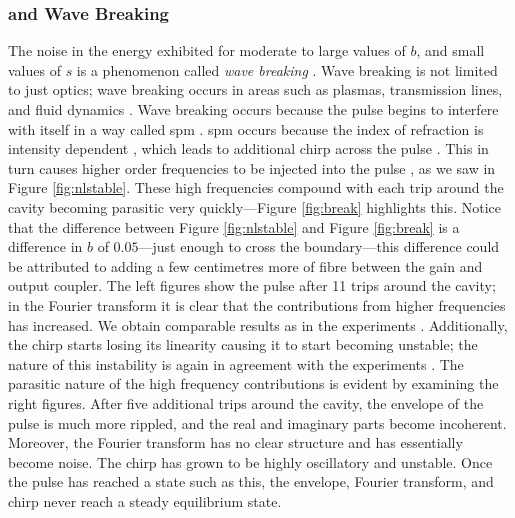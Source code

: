 \subsubsection{ and Wave Breaking}

The noise in the energy exhibited for moderate to large values of $b$, and small values of $s$ is a phenomenon called \emph{wave breaking} \cite{agrawal2013, anderson, finot, rothenberg, tomlinson}. Wave breaking is not limited to just optics; wave breaking occurs in areas such as plasmas, transmission lines, and fluid dynamics \cite{rothenberg}. Wave breaking occurs because the pulse begins to interfere with itself in a way called \gls{spm} \cite{agrawal2002, agrawal2013, becker}. \gls{spm} occurs because the index of refraction is intensity dependent \cite{agrawal2002, becker, rothenberg, silfvast}, which leads to additional chirp across the pulse \cite{agrawal2013, anderson, rothenberg, silfvast}. This in turn causes higher order frequencies to be injected into the pulse \cite{agrawal2013, anderson}, as we saw in Figure \ref{fig:nlstable}. These high frequencies compound with each trip around the cavity becoming parasitic very quickly---Figure \ref{fig:break} highlights this. Notice that the difference between Figure \ref{fig:nlstable} and Figure \ref{fig:break} is a difference in $b$ of $0.05$---just enough to cross the boundary---this difference could be attributed to adding a few centimetres more of fibre between the gain and output coupler. The left figures show the pulse after 11 trips around the cavity; in the Fourier transform it is clear that the contributions from higher frequencies has increased. We obtain comparable results as in the experiments \cite{anderson, rothenberg}. Additionally, the chirp starts losing its linearity causing it to start becoming unstable; the nature of this instability is again in agreement with the experiments \cite{anderson, rothenberg}. The parasitic nature of the high frequency contributions is evident by examining the right figures. After five additional trips around the cavity, the envelope of the pulse is much more rippled, and the real and imaginary parts become incoherent. Moreover, the Fourier transform has no clear structure and has essentially become noise. The chirp has grown to be highly oscillatory and unstable. Once the pulse has reached a state such as this, the envelope, Fourier transform, and chirp never reach a steady equilibrium state. \\

